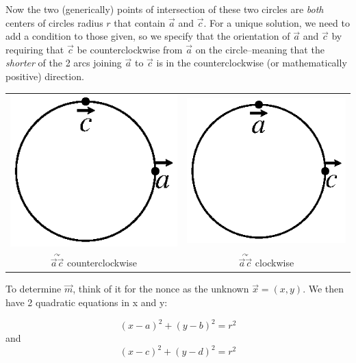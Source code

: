 \documentclass[12pt]{article}
\begin{document}
Now the two (generically) points of intersection of these two circles
are {\em both} centers of circles radius $r$ that contain
$\vec{a}$ and $\vec{c}$. For a unique solution, we
need to add a condition to those given, so we specify that the
orientation of $\vec{a}$ and $\vec{c}$ by
requiring that $\vec{c}$ be counterclockwise from
$\vec{a}$ on the circle--meaning that the {\em shorter} of
the 2 arcs joining $\vec{a}$ to $\vec{c}$ is in
the counterclockwise (or mathematically positive) direction.

\begin{tabular}[c]{cc}
\includegraphics{FinnFigure2a.ps} & \includegraphics{FinnFigure2b.ps} \\
$\overset{\curvearrowright}{\vec{a}\vec{c}}$ counterclockwise &
$\overset{\curvearrowright}{\vec{a}\vec{c}}$ clockwise \\
\end{tabular}

To determine $\vec{m}$, think of it for the nonce as the unknown $\vec{x}
= (x,y)$. We then have 2 quadratic equations in x and y:


\begin{equation}
{(x-a)}^2 + {(y-b)}^2 = r^2
\label{e1}
\end{equation}
and
\begin{equation}
{(x-c)}^2 + {(y-d)}^2 = r^2
\label{e2}
\end{equation}
\end{document}
